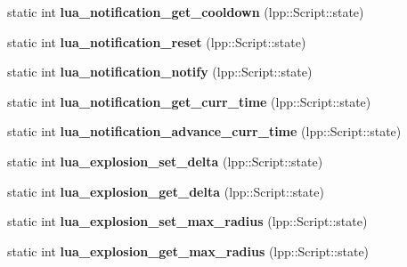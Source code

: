 \begin{DoxyCompactItemize}
\item 
static int {\bfseries lua\+\_\+notification\+\_\+get\+\_\+cooldown} (lpp\+::\+Script\+::state)\hypertarget{class_lua_interface_a65377d88ac6485a56f56c9d83ad544c6}{}\label{class_lua_interface_a65377d88ac6485a56f56c9d83ad544c6}

\item 
static int {\bfseries lua\+\_\+notification\+\_\+reset} (lpp\+::\+Script\+::state)\hypertarget{class_lua_interface_a4718f44ce52147a1d0087e91ec0afea4}{}\label{class_lua_interface_a4718f44ce52147a1d0087e91ec0afea4}

\item 
static int {\bfseries lua\+\_\+notification\+\_\+notify} (lpp\+::\+Script\+::state)\hypertarget{class_lua_interface_ad11bc4a086c029057453bd3784fc7462}{}\label{class_lua_interface_ad11bc4a086c029057453bd3784fc7462}

\item 
static int {\bfseries lua\+\_\+notification\+\_\+get\+\_\+curr\+\_\+time} (lpp\+::\+Script\+::state)\hypertarget{class_lua_interface_aef4b747c227d4e515c1d848043b2a9b1}{}\label{class_lua_interface_aef4b747c227d4e515c1d848043b2a9b1}

\item 
static int {\bfseries lua\+\_\+notification\+\_\+advance\+\_\+curr\+\_\+time} (lpp\+::\+Script\+::state)\hypertarget{class_lua_interface_a670ace809680aa413a77b6e3221aeab1}{}\label{class_lua_interface_a670ace809680aa413a77b6e3221aeab1}

\item 
static int {\bfseries lua\+\_\+explosion\+\_\+set\+\_\+delta} (lpp\+::\+Script\+::state)\hypertarget{class_lua_interface_a464cc4f2499e9ef4b044d1425d1a8d6b}{}\label{class_lua_interface_a464cc4f2499e9ef4b044d1425d1a8d6b}

\item 
static int {\bfseries lua\+\_\+explosion\+\_\+get\+\_\+delta} (lpp\+::\+Script\+::state)\hypertarget{class_lua_interface_aaf352df035e2b7196c726671c2e008bd}{}\label{class_lua_interface_aaf352df035e2b7196c726671c2e008bd}

\item 
static int {\bfseries lua\+\_\+explosion\+\_\+set\+\_\+max\+\_\+radius} (lpp\+::\+Script\+::state)\hypertarget{class_lua_interface_a1724cf48f812f9a05e4412e6ece4c35f}{}\label{class_lua_interface_a1724cf48f812f9a05e4412e6ece4c35f}

\item 
static int {\bfseries lua\+\_\+explosion\+\_\+get\+\_\+max\+\_\+radius} (lpp\+::\+Script\+::state)\hypertarget{class_lua_interface_af0b50f861dcf65a7aa91b7714134ef72}{}\label{class_lua_interface_af0b50f861dcf65a7aa91b7714134ef72}


\end{DoxyCompactItemize}
